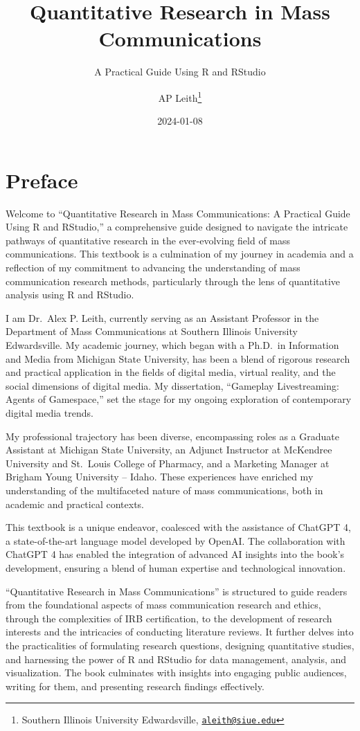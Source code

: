 \documentclass[
]{book}
\title{Quantitative Research in Mass Communications}
\subtitle{A Practical Guide Using R and RStudio}
\author{AP Leith\footnote{Southern Illinois University Edwardsville, \href{mailto:aleith@siue.edu}{\nolinkurl{aleith@siue.edu}}}}
\date{2024-01-08}
\begin{document}
\maketitle

{
\setcounter{tocdepth}{1}
\tableofcontents
}
\hypertarget{preface}{%
\chapter*{Preface}\label{preface}}

Welcome to ``Quantitative Research in Mass Communications: A Practical Guide Using R and RStudio,'' a comprehensive guide designed to navigate the intricate pathways of quantitative research in the ever-evolving field of mass communications. This textbook is a culmination of my journey in academia and a reflection of my commitment to advancing the understanding of mass communication research methods, particularly through the lens of quantitative analysis using R and RStudio.

I am Dr.~Alex P. Leith, currently serving as an Assistant Professor in the Department of Mass Communications at Southern Illinois University Edwardsville. My academic journey, which began with a Ph.D.~in Information and Media from Michigan State University, has been a blend of rigorous research and practical application in the fields of digital media, virtual reality, and the social dimensions of digital media. My dissertation, ``Gameplay Livestreaming: Agents of Gamespace,'' set the stage for my ongoing exploration of contemporary digital media trends.

My professional trajectory has been diverse, encompassing roles as a Graduate Assistant at Michigan State University, an Adjunct Instructor at McKendree University and St.~Louis College of Pharmacy, and a Marketing Manager at Brigham Young University -- Idaho. These experiences have enriched my understanding of the multifaceted nature of mass communications, both in academic and practical contexts.

This textbook is a unique endeavor, coalesced with the assistance of ChatGPT 4, a state-of-the-art language model developed by OpenAI. The collaboration with ChatGPT 4 has enabled the integration of advanced AI insights into the book's development, ensuring a blend of human expertise and technological innovation.

``Quantitative Research in Mass Communications'' is structured to guide readers from the foundational aspects of mass communication research and ethics, through the complexities of IRB certification, to the development of research interests and the intricacies of conducting literature reviews. It further delves into the practicalities of formulating research questions, designing quantitative studies, and harnessing the power of R and RStudio for data management, analysis, and visualization. The book culminates with insights into engaging public audiences, writing for them, and presenting research findings effectively.
\end{document}
